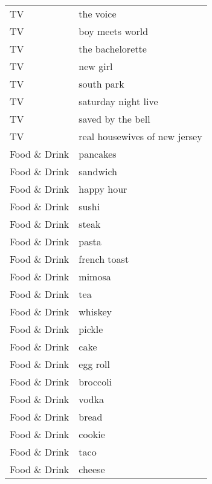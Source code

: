 \begin{supertabular}{l p{0.25\textwidth}}
               TV &                          the voice \\
               TV &                    boy meets world \\
               TV &                   the bachelorette \\
               TV &                           new girl \\
               TV &                         south park \\
               TV &                saturday night live \\
               TV &                  saved by the bell \\
               TV &      real housewives of new jersey \\
     Food \& Drink &                           pancakes \\
     Food \& Drink &                           sandwich \\
     Food \& Drink &                         happy hour \\
     Food \& Drink &                              sushi \\
     Food \& Drink &                              steak \\
     Food \& Drink &                              pasta \\
     Food \& Drink &                       french toast \\
     Food \& Drink &                             mimosa \\
     Food \& Drink &                                tea \\
     Food \& Drink &                            whiskey \\
     Food \& Drink &                             pickle \\
     Food \& Drink &                               cake \\
     Food \& Drink &                           egg roll \\
     Food \& Drink &                           broccoli \\
     Food \& Drink &                              vodka \\
     Food \& Drink &                              bread \\
     Food \& Drink &                             cookie \\
     Food \& Drink &                               taco \\
     Food \& Drink &                             cheese \\

\end{supertabular}

